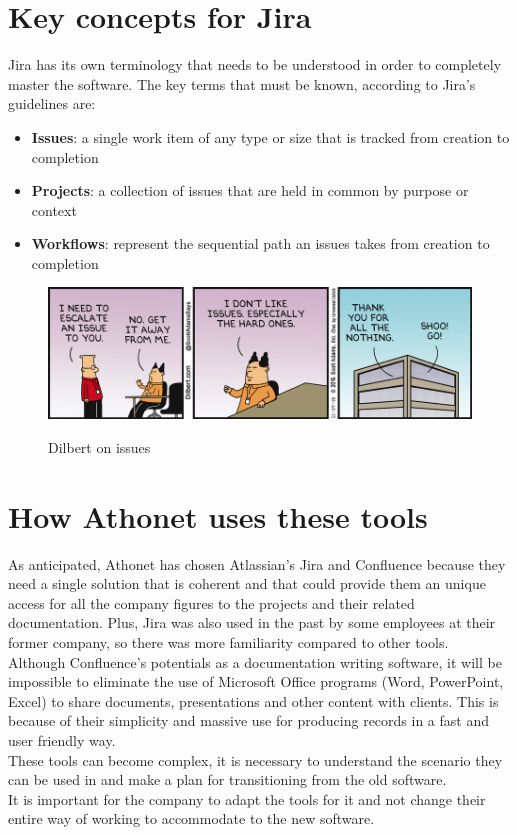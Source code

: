 \section{Key concepts for Jira}
	Jira has its own terminology that needs to be understood in order to completely master the software.
	The key terms that must be known, according to Jira's guidelines\cite{key-terms-to-know} are:
	\begin{itemize}
		\item \textbf{Issues}: a single work item of any type or size that is tracked from creation to completion
		\item \textbf{Projects}: a collection of issues that are held in common by purpose or context
		\item \textbf{Workflows}: represent the sequential path an issues takes from creation to completion
	\end{itemize}
	\begin{figure}[H]
		\centering
		\includegraphics[width=\textwidth]{resources/issues}\\
		\caption{Dilbert on issues}
	\end{figure}
	
\section{How Athonet uses these tools}
	As anticipated, Athonet has chosen Atlassian's Jira and Confluence because they need a single solution that is coherent and that could provide them an unique access for all the company figures to the projects and their related documentation.
	Plus, Jira was also used in the past by some employees at their former company, so there was more familiarity compared to other tools.\\
	Although Confluence's potentials as a documentation writing software, it will be impossible to eliminate the use of Microsoft Office programs (Word, PowerPoint, Excel) to share documents, presentations and other content with clients.
	This is because of their simplicity and massive use for producing records in a fast and user friendly way.\\
	These tools can become complex, it is necessary to understand the scenario they can be used in and make a plan for transitioning from the old software.\\
	It is important for the company to adapt the tools for it and not change their entire way of working to accommodate to the new software.
